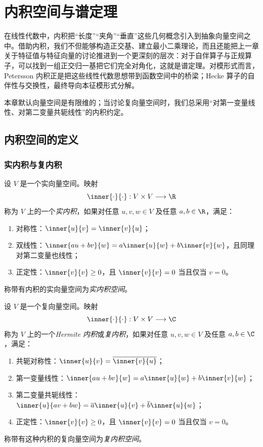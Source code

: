 \chapter{内积空间与谱定理}

在线性代数中，内积把“长度”“夹角”“垂直”这些几何概念引入到抽象向量空间之中。借助内积，我们不但能够构造正交基、建立最小二乘理论，而且还能把上一章关于特征值与特征向量的讨论推进到一个更深刻的层次：对于自伴算子与正规算子，可以找到一组正交归一基把它们完全对角化，这就是谱定理。对模形式而言，Petersson 内积正是把这些线性代数思想带到函数空间中的桥梁；Hecke 算子的自伴性与交换性，最终导向本征模形式分解。

本章默认向量空间是有限维的；当讨论复向量空间时，我们总采用“对第一变量线性、对第二变量共轭线性”的内积约定。

\section{内积空间的定义}

\subsection{实内积与复内积}

\begin{definition}
设 $V$ 是一个实向量空间。映射
\[
\inner{\cdot}{\cdot} : V \times V \longrightarrow \R
\]
称为 $V$ 上的一个\emph{实内积}，如果对任意 $u,v,w\in V$ 及任意 $a,b\in\R$，满足：
\begin{enumerate}[label=\textnormal{(\arabic*)}]
  \item 对称性：$\inner{u}{v}=\inner{v}{u}$；
  \item 双线性：$\inner{au+bv}{w}=a\inner{u}{w}+b\inner{v}{w}$，且同理对第二变量也线性；
  \item 正定性：$\inner{v}{v}\ge 0$，且 $\inner{v}{v}=0$ 当且仅当 $v=0$。
\end{enumerate}
称带有内积的实向量空间为\emph{实内积空间}。
\end{definition}

\begin{definition}
设 $V$ 是一个复向量空间。映射
\[
\inner{\cdot}{\cdot}:V\times V\longrightarrow \C
\]
称为 $V$ 上的一个\emph{Hermite 内积}或\emph{复内积}，如果对任意 $u,v,w\in V$ 及任意 $a,b\in\C$，满足：
\begin{enumerate}[label=\textnormal{(\arabic*)}]
  \item 共轭对称性：$\inner{u}{v}=\overline{\inner{v}{u}}$；
  \item 第一变量线性：$\inner{au+bv}{w}=a\inner{u}{w}+b\inner{v}{w}$；
  \item 第二变量共轭线性：$\inner{u}{av+bw}=\overline{a}\inner{u}{v}+\overline{b}\inner{u}{w}$；
  \item 正定性：$\inner{v}{v}\ge 0$，且 $\inner{v}{v}=0$ 当且仅当 $v=0$。
\end{enumerate}
称带有这种内积的复向量空间为\emph{复内积空间}。
\end{definition}

